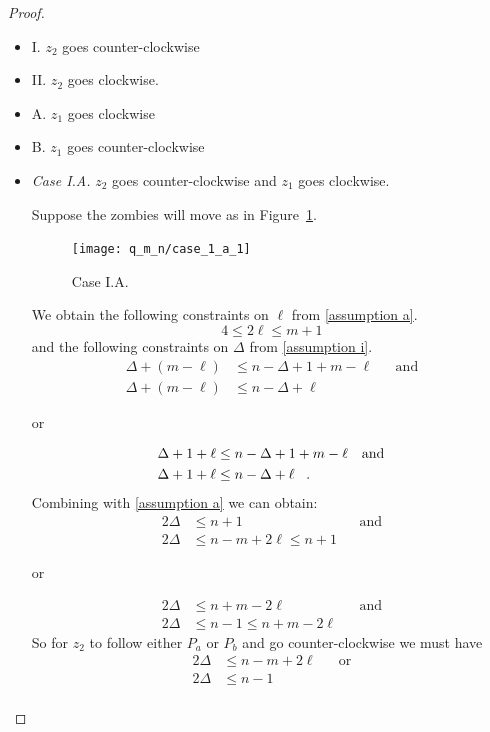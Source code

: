 \begin{proof}
\begin{proofpart}
  \begin{itemize}
   \item I. $z_2$ goes counter-clockwise
   \item II. $z_2$ goes clockwise.
   \item A. $z_1$ goes clockwise
   \item B. $z_1$ goes counter-clockwise
  \end{itemize}

\begin{itemize}
  \item \textit{Case I.A.} $z_2$ goes counter-clockwise and $z_1$ goes clockwise.

  Suppose the zombies will move as in Figure~\ref{fig:case_1_a_1}.
  \begin{figure}
    \centering
    \texttt{[image: q\_m\_n/case\_1\_a\_1]}
    \caption{Case I.A. \label{fig:case_1_a_1}}
  \end{figure}

  We obtain the following constraints on $\ell$ from \ref{assumption a}.
  \[ 4 \leq 2 \ell \leq m + 1 \]
  and the following constraints on $\Delta$ from \ref{assumption i}.
  \begin{align*}
   \Delta + (m - \ell) &\leq n - \Delta + 1 + m - \ell && \text{and} \\
   \Delta + (m - \ell) &\leq n - \Delta + \ell
  \end{align*}
  \begin{center}or\end{center}
  \begin{align*}
   \Delta + 1 + \ell &\leq n - \Delta + 1 + m - \ell && \text{and} \\
   \Delta + 1 + \ell &\leq n - \Delta + \ell \mperiod
  \end{align*}
  Combining with \ref{assumption a} we can obtain:
  \begin{align*}
   2 \Delta &\leq n+1 && \text{and} \\
   2 \Delta &\leq n - m + 2\ell \leq n+1
  \end{align*}
  \begin{center}or\end{center}
  \begin{align*}
   2 \Delta &\leq n+m -2 \ell && \text{and} \\
   2 \Delta &\leq n -1 \leq n + m - 2\ell
  \end{align*}
  So for $z_2$ to follow either $P_a$ or $P_b$ and go counter-clockwise we must have
  \begin{align*}
   2 \Delta &\leq n - m + 2\ell && \text{or} \\
   2 \Delta &\leq n - 1                     \\
  \end{align*}


\end{itemize}
\end{proofpart}
\end{proof}

